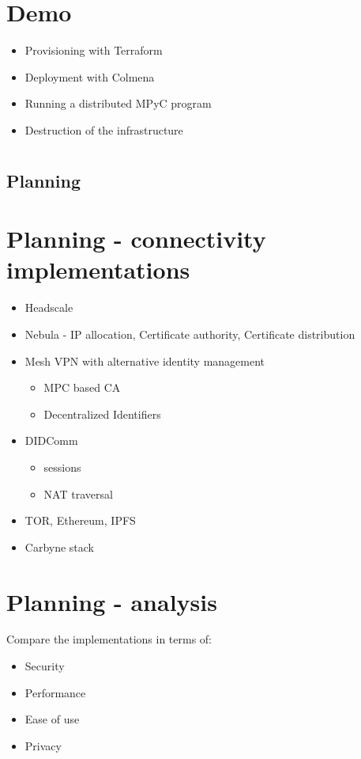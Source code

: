 \hypertarget{demo}{%
\chapter{Demo}\label{demo}}

\begin{itemize}
\tightlist
\item
  Provisioning with Terraform
\item
  Deployment with Colmena
\item
  Running a distributed MPyC program
\item
  Destruction of the infrastructure
\end{itemize}

\hypertarget{section}{%
\chapter{}\label{section}}

\section{Planning}

\hypertarget{planning---connectivity-implementations}{%
\chapter{Planning - connectivity
implementations}\label{planning---connectivity-implementations}}

\begin{itemize}
\tightlist
\item
  Headscale
\item
  Nebula - IP allocation, Certificate authority, Certificate
  distribution
\item
  Mesh VPN with alternative identity management

  \begin{itemize}
  \tightlist
  \item
    MPC based CA
  \item
    Decentralized Identifiers
  \end{itemize}
\item
  DIDComm

  \begin{itemize}
  \tightlist
  \item
    sessions
  \item
    NAT traversal
  \end{itemize}
\item
  TOR, Ethereum, IPFS
\item
  Carbyne stack
\end{itemize}

\hypertarget{planning---analysis}{%
\chapter{Planning - analysis}\label{planning---analysis}}

Compare the implementations in terms of:

\begin{itemize}
\tightlist
\item
  Security
\item
  Performance
\item
  Ease of use
\item
  Privacy
\end{itemize}
